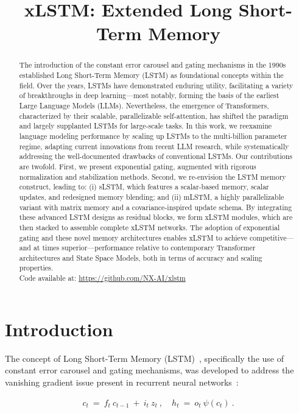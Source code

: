 \title{xLSTM: Extended Long Short-Term Memory}

\begin{abstract}
The introduction of the constant error carousel and gating mechanisms in the 1990s established Long Short-Term Memory (LSTM) as foundational concepts within the field. Over the years, LSTMs have demonstrated enduring utility, facilitating a variety of breakthroughs in deep learning—most notably, forming the basis of the earliest Large Language Models (LLMs). Nevertheless, the emergence of Transformers, characterized by their scalable, parallelizable self-attention, has shifted the paradigm and largely supplanted LSTMs for large-scale tasks. In this work, we reexamine language modeling performance by scaling up LSTMs to the multi-billion parameter regime, adapting current innovations from recent LLM research, while systematically addressing the well-documented drawbacks of conventional LSTMs. Our contributions are twofold. First, we present exponential gating, augmented with rigorous normalization and stabilization methods. Second, we re-envision the LSTM memory construct, leading to: (i) sLSTM, which features a scalar-based memory, scalar updates, and redesigned memory blending; and (ii) mLSTM, a highly parallelizable variant with matrix memory and a covariance-inspired update schema. By integrating these advanced LSTM designs as residual blocks, we form xLSTM modules, which are then stacked to assemble complete xLSTM networks. The adoption of exponential gating and these novel memory architectures enables xLSTM to achieve competitive—and at times superior—performance relative to contemporary Transformer architectures and State Space Models, both in terms of accuracy and scaling properties.\\
Code available at: \url{https://github.com/NX-AI/xlstm}
\end{abstract}

\section{Introduction}
\label{sec:intro}

The concept of Long Short-Term Memory (LSTM)~\citep{Hochreiter:91,Hochreiter:97nips,Hochreiter:97}, specifically the use of constant error carousel and gating mechanisms, was developed to address the vanishing gradient issue present in recurrent neural networks~\citep{Hochreiter:91,Hochreiter:00book}:

\begin{align}
\label{eq:lstm_idea}
  c_t \ = \ f_t \ c_{t-1} \ + \ 
          i_t \  z_t \ , \quad  
          h_t \ = \ o_t \ \psi({c_t}) \ . 
\end{align}

